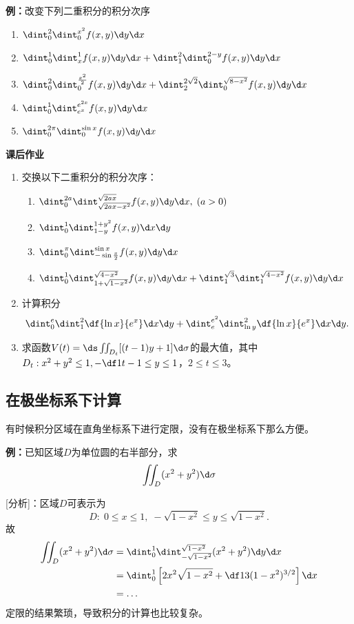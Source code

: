{\bf 例：}改变下列二重积分的积分次序
\begin{enumerate}[(1)]
  \setlength{\itemindent}{1cm}
  \item $\dint_0^2\dint_0^{x^2}f(x,y)\d y\d x$
  \item $\dint_0^1\dint_x^1f(x,y)\d y\d x+\dint_1^2\dint_0^{2-y}f(x,y)\d y\d x$
  \item $\dint_0^2\dint_0^{\frac{x^2}2}f(x,y)\d y\d x
  +\dint_2^{2\sqrt2}\dint_0^{\sqrt{8-x^2}}f(x,y)\d y\d x$
  \item $\dint_0^1\dint_{e^x}^{e^{2x}}f(x,y)\d y\d x$
  \item $\dint_0^{2\pi}\dint_0^{\sin x}f(x,y)\d y\d x$
\end{enumerate}

\begin{ext}
	{\bf 课后作业}
	\begin{enumerate}
	  \item 交换以下二重积分的积分次序：
		 \begin{enumerate}[(1)]
		    \item $\dint_0^{2a}\dint_{\sqrt{2ax-x^2}}^{\sqrt{2ax}}
  			f(x,y)\d y\d x,\;(a>0)$ 
  			\item $\dint_0^1\dint_{1-y}^{1+y^2}f(x,y)\d x\d y$
		    \item $\dint_0^{\pi}\dint_{-\sin\frac x2}^{\sin x}f(x,y)\d y\d x$
		    \item $\dint_0^1\dint_{1+\sqrt{1-x^2}}^{\sqrt{4-x^2}}f(x,y)\d y\d x
		    +\dint_1^{\sqrt3}\dint_1^{\sqrt{4-x^2}}f(x,y)\d y\d x$
		 \end{enumerate}
	  \item 计算积分
	  $$\dint_0^e\dint_1^2\df{\ln x}{e^x}\d x\d y
	  +\dint_e^{e^2}\dint_{\ln y}^2\df{\ln x}{e^x}\d x\d y.$$
	  \item 求函数$V(t)=\ds\iint_{D_t}[(t-1)y+1]\d\sigma$的最大值，其中
	  $D_t:x^2+y^2\leq1,-\df1{t-1}\leq y\leq1$，$2\leq t\leq3$。
	\end{enumerate}
\end{ext}

\subsection{在极坐标系下计算}

有时候积分区域在直角坐标系下进行定限，没有在极坐标系下那么方便。

{\bf 例：}已知区域$D$为单位圆的右半部分，求
$$\iint_D(x^2+y^2)\d\sigma$$

[分析]：区域$D$可表示为
$$D:\;0\leq x\leq 1,\;-\sqrt{1-x^2}\leq y\leq\sqrt{1-x^2}.$$
故
\begin{align*}
	\iint_D(x^2+y^2)\d\sigma
	&=\dint_0^1\dint_{-\sqrt{1-x^2}}^{\sqrt{1-x^2}}(x^2+y^2)\d y\d x\\
	&=\dint_0^1\left[2x^2\sqrt{1-x^2}+\df13(1-x^2)^{3/2}\right]\d x\\
	&=\ldots
\end{align*}
定限的结果繁琐，导致积分的计算也比较复杂。

